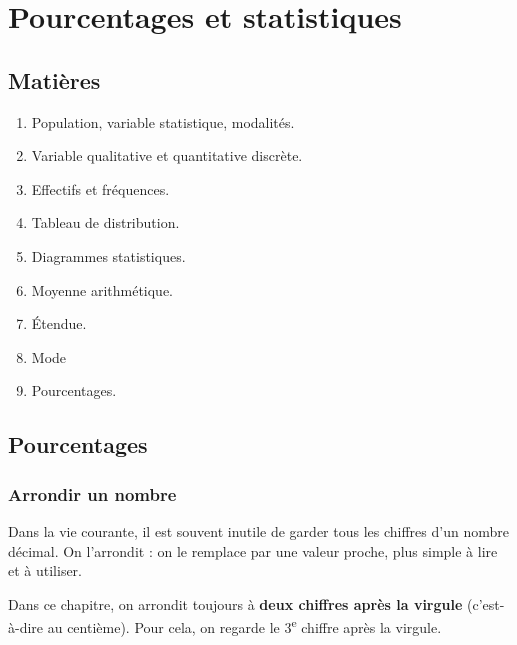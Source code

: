 \documentclass[../../syllabus_1.tex]{subfiles}
\begin{document}
\chapter{Pourcentages et statistiques}

\section*{Matières}
\begin{enumerate}[label=\textbf{\arabic*.}]
    \item Population, variable statistique, modalités.
    \item Variable qualitative et quantitative discrète.
    \item Effectifs et fréquences.
    \item Tableau de distribution.
    \item Diagrammes statistiques.
    \item Moyenne arithmétique.
    \item Étendue.
    \item Mode
    \item Pourcentages.
\end{enumerate}

\section{Pourcentages}

\subsection{Arrondir un nombre}

Dans la vie courante, il est souvent inutile de garder tous les chiffres d'un nombre décimal. On l'arrondit : on le remplace par une valeur proche, plus simple à lire et à utiliser.

Dans ce chapitre, on arrondit toujours à \textbf{deux chiffres après la virgule} (c'est-à-dire au centième). Pour cela, on regarde le 3\textsuperscript{e} chiffre après la virgule.
\end{document}
